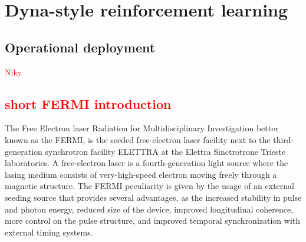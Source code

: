 \documentclass[
 reprint,
 amsmath,amssymb,amsfonts,clevref,
 aps,
prstab,
]{revtex4-2}
\newcommand{\NB}[1]{\textcolor{red}{#1}}
\begin{document}

\section{Dyna-style reinforcement learning}


\subsection{Operational deployment}
\NB{Niky} %
\subsection{\NB{short FERMI introduction}}
The Free Electron laser Radiation for Multidisciplinary Investigation  better known as the FERMI, is the seeded free-electron laser facility next to the third-generation synchrotron facility ELETTRA at the Elettra Sinctrotrone Trieste laboratories.
A free-electron laser is a fourth-generation light source where the lasing medium consists of very-high-speed electron moving freely through a magnetic structure. The FERMI peculiarity is given by the usage of an external seeding source that provides several advantages, as the increased stability in pulse and photon energy, reduced size of the device, improved longitudinal coherence, more control on the pulse structure, and improved temporal synchronization with external timing systems.
\end{document}
